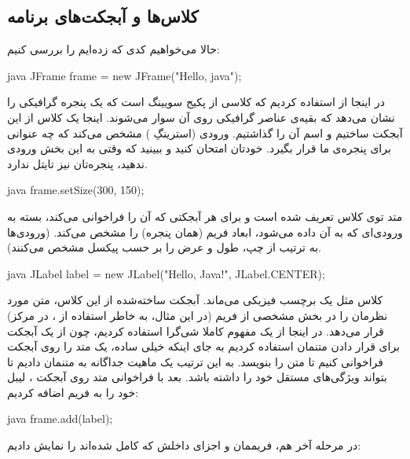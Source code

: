 \subsection{کلاس‌ها و آبجکت‌های برنامه }

حالا می‌خواهیم کدی که زده‌ایم را بررسی کنیم:

\begin{codebox}{java}
JFrame frame = new JFrame("Hello, java");
\end{codebox}

در اینجا از  استفاده کردیم که کلاسی از پکیج سویینگ
است که یک پنجره گرافیکی را نشان می‌دهد که بقیه‌ی عناصر گرافیکی روی آن سوار
می‌شوند. اینجا یک کلاس از این آبجکت ساختیم و اسم آن را 
گذاشتیم. ورودی (استرینگِ  ) مشخص می‌کند که چه
عنوانی برای پنجره‌ی ما قرار بگیرد. خودتان امتحان کنید و ببینید که وقتی به
این بخش ورودی ندهید، پنجره‌تان نیز تایتل ندارد.

\begin{codebox}{java}
frame.setSize(300, 150);
\end{codebox}

متد  توی کلاس  تعریف شده است
و برای هر آبجکتی که آن را فراخوانی می‌کند، بسته به ورودی‌ای که به آن داده
می‌شود، ابعاد فریم (همان پنجره) را مشخص می‌کند. (ورودی‌ها به ترتیب از چپ،
طول و عرض را بر حسب پیکسل مشخص می‌کنند).

\begin{codebox}{java}
JLabel label = new JLabel("Hello, Java!", JLabel.CENTER);
\end{codebox}

کلاس  مثل یک برچسب فیزیکی می‌ماند. آبجکت ساخته‌شده از
این کلاس، متن مورد نظرمان را در بخش مشخصی از فریم (در این مثال، به خاطر
استفاده از  ، در مرکز) قرار می‌دهد. در اینجا از یک
مفهوم کاملا شی‌گرا استفاده کردیم، چون از یک آبجکت برای قرار دادن متنمان
استفاده کردیم به جای اینکه خیلی ساده، یک متد را روی آبجکت 
فراخوانی کنیم تا متن را بنویسد. به این ترتیب یک ماهیت جداگانه به متنمان
دادیم تا بتواند ویژگی‌های مستقل خود را داشته باشد. بعد با فراخوانی متد
 روی آبجکت ، لیبل خود را به فریم
اضافه کردیم:

\begin{codebox}{java}
frame.add(label);
\end{codebox}

در مرحله آخر هم، فریممان و اجزای داخلش که کامل شده‌اند را نمایش دادیم:

